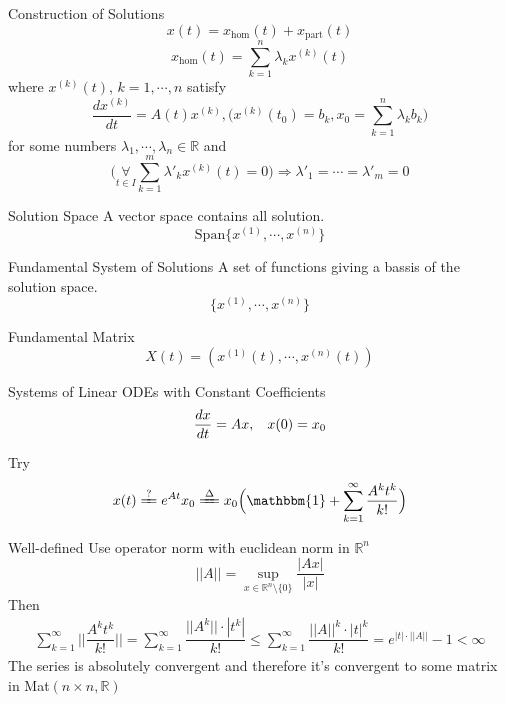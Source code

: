 \documentclass{beamer}
\begin{document}
\begin{frame}
\begin{block}{Construction of Solutions}
$$x(t)=x_{\text{hom}}(t)+x_{\text{part}}(t)$$
$$x_{\text{hom}}(t)=\sum\limits_{k=1}^n\lambda_kx^{(k)}(t)$$
where $x^{(k)}(t)$, $k=1,\cdots,n$ satisfy
$$\dfrac{dx^{(k)}}{dt}=A(t)x^{(k)},\Big(x^{(k)}(t_0)=b_k,x_0=\sum\limits_{k=1}^n\lambda_kb_k\Big)$$
for some numbers $\lambda_1,\cdots,\lambda_n\in\mathbb{R}$ and
$$\Big(\mathop{\forall}\limits_{t\in I}\sum\limits_{k=1}^m\lambda'_kx^{(k)}(t)=0\Big)\Rightarrow \lambda'_1=\cdots=\lambda'_m=0$$
\end{block}
\end{frame}

\begin{frame}
\begin{block}{Solution Space}
A vector space contains all solution.
$$\text{Span}\lbrace x^{(1)},\cdots,x^{(n)}\rbrace$$
\end{block}
\begin{block}{Fundamental System of Solutions}
A set of functions giving a bassis of the solution space.
$$\lbrace x^{(1)},\cdots,x^{(n)}\rbrace$$
\end{block}
\begin{block}{Fundamental Matrix}
$$X(t)=(x^{(1)}(t),\cdots,x^{(n)}(t))$$
\end{block}
\end{frame}

\begin{frame}
\begin{block}{Systems of Linear ODEs with Constant Coefficients}
$$\dfrac{dx}{dt}=Ax,\hspace{3mm}x(0)=x_0$$
\end{block}
\begin{block}{Try}
\begin{align*}
x(t)\xlongequal{?} e^{At}x_0\xlongequal{\Delta}x_0\Big(\mathbbm{1}+\sum\limits_{k=1}^{\infty}\dfrac{A^kt^k}{k!}\Big)
\end{align*}
\end{block}
\end{frame}

\begin{frame}
\begin{block}{Well-defined}
Use operator norm with euclidean norm in $\mathbb{R}^n$
$$||A||=\sup_{x\in\mathbb{R}^n\setminus\lbrace0\rbrace}\dfrac{|Ax|}{|x|}$$
Then
\begin{align*}
\sum\limits_{k=1}^{\infty}\Bigg|\Bigg|\dfrac{A^kt^k}{k!}\Bigg|\Bigg|=\sum\limits_{k=1}^{\infty}\dfrac{||A^k||\cdot|t^k|}{k!}\leqslant\sum\limits_{k=1}^{\infty}\dfrac{||A||^k\cdot|t|^k}{k!}=e^{|t|\cdot||A||}-1<\infty
\end{align*}
The series is absolutely convergent and therefore it's convergent to some matrix in Mat$(n\times n,\mathbb{R})$ 
\end{block}
\end{frame}
\end{document}
